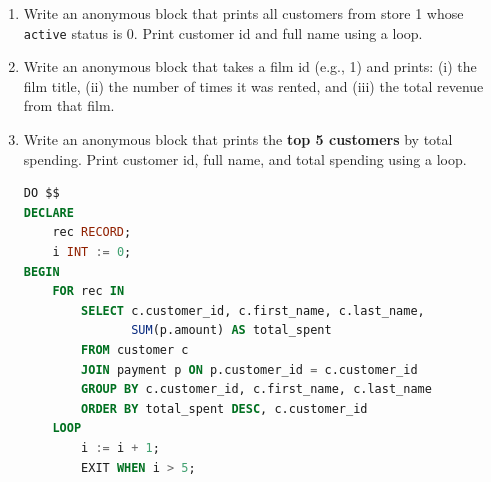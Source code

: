 \documentclass[12pt,a4paper]{article}
\newif\ifshowsolutions
\begin{document}
\begin{enumerate}
\item Write an anonymous block that prints all customers from store 1 whose \texttt{active} status is 0. Print customer id and full name using a loop.

\ifshowsolutions
\begin{lstlisting}[language=SQL]
DO $$
DECLARE
    rec RECORD;
BEGIN
    FOR rec IN
        SELECT customer_id, first_name, last_name
        FROM customer
        WHERE store_id = 1 AND active = 0
        ORDER BY customer_id
    LOOP
        RAISE NOTICE 'Inactive customer: ID=% Name=% %',
            rec.customer_id, rec.first_name, rec.last_name;
    END LOOP;
END $$;
\end{lstlisting}
\fi

\item Write an anonymous block that takes a film id (e.g., 1) and prints:
(i) the film title,
(ii) the number of times it was rented, and
(iii) the total revenue from that film.

\ifshowsolutions
\begin{lstlisting}[language=SQL]
DO $$
DECLARE
    v_film_id INT := 1;
    v_title TEXT;
    v_rentals INT;
    v_revenue NUMERIC;
BEGIN
    SELECT title INTO v_title
    FROM film
    WHERE film_id = v_film_id;

    IF NOT FOUND THEN
        RAISE NOTICE 'Film id % not found', v_film_id;
        RETURN;
    END IF;

    SELECT COUNT(r.rental_id),
           COALESCE(SUM(p.amount),0)
    INTO v_rentals, v_revenue
    FROM inventory i
    JOIN rental r ON r.inventory_id = i.inventory_id
    LEFT JOIN payment p ON p.rental_id = r.rental_id
    WHERE i.film_id = v_film_id;

    RAISE NOTICE 'Film: % (id=%), Rentals=%, Revenue=%',
        v_title, v_film_id, v_rentals, v_revenue;
END $$;
\end{lstlisting}
\fi

\item Write an anonymous block that prints the \textbf{top 5 customers} by total spending. Print customer id, full name, and total spending using a loop.

\ifshowsolutions
\begin{lstlisting}[language=SQL]
DO $$
DECLARE
    rec RECORD;
    i INT := 0;
BEGIN
    FOR rec IN
        SELECT c.customer_id, c.first_name, c.last_name,
               SUM(p.amount) AS total_spent
        FROM customer c
        JOIN payment p ON p.customer_id = c.customer_id
        GROUP BY c.customer_id, c.first_name, c.last_name
        ORDER BY total_spent DESC, c.customer_id
    LOOP
        i := i + 1;
        EXIT WHEN i > 5;


\end{lstlisting}
\end{enumerate}
\end{document}

